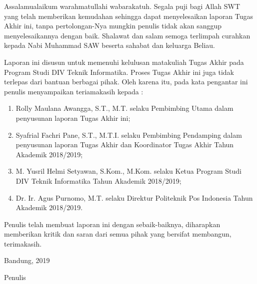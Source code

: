 \begin{acknowledgements}
\thispagestyle{plain}
Assalamualaikum warahmatullahi wabarakatuh. Segala puji bagi Allah SWT yang telah memberikan kemudahan sehingga dapat menyelesaikan laporan Tugas Akhir ini, tanpa pertolongan-Nya mungkin penulis tidak akan sanggup menyelesaikannya dengan baik. Shalawat dan salam semoga terlimpah curahkan kepada Nabi Muhammad SAW beserta sahabat dan keluarga Beliau.

Laporan ini disusun untuk memenuhi kelulusan matakuliah Tugas Akhir pada Program Studi DIV Teknik Informatika. Proses Tugas Akhir ini juga tidak terlepas dari bantuan berbagai pihak. Oleh karena itu, pada kata pengantar ini penulis menyampaikan teriamakasih kepada :
\begin{enumerate}

\item Rolly Maulana Awangga, S.T., M.T. selaku Pembimbing Utama dalam penyusunan laporan Tugas Akhir ini;
\item	Syafrial Fachri Pane, S.T., M.T.I. selaku Pembimbing Pendamping dalam penyusunan laporan Tugas Akhir dan Koordinator Tugas Akhir Tahun Akademik 2018/2019;
\item	M. Yusril Helmi Setyawan, S.Kom., M.Kom. selaku Ketua Program Studi DIV Teknik Informatika Tahun Akademik 2018/2019;
\item	Dr. Ir. Agus Purnomo, M.T. selaku Direktur Politeknik Pos Indonesia Tahun Akademik 2018/2019.

\end{enumerate}

Penulis telah membuat laporan ini dengan sebaik-baiknya, diharapkan memberikan kritik dan saran dari semua pihak yang bersifat membangun, terimakasih.

\begin{raggedleft}

Bandung, 2019

Penulis

\end{raggedleft}

\end{acknowledgements}